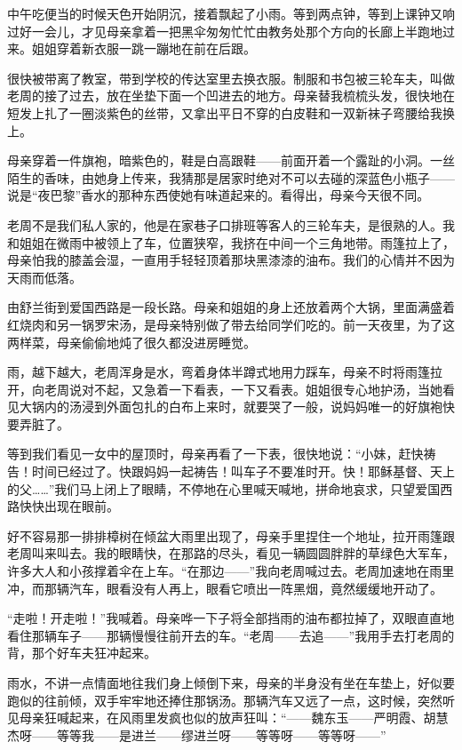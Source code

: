 \par 中午吃便当的时候天色开始阴沉，接着飘起了小雨。等到两点钟，等到上课钟又响过好一会儿，才见母亲拿着一把黑伞匆匆忙忙由教务处那个方向的长廊上半跑地过来。姐姐穿着新衣服一跳一蹦地在前在后跟。
\par 很快被带离了教室，带到学校的传达室里去换衣服。制服和书包被三轮车夫，叫做老周的接了过去，放在坐垫下面一个凹进去的地方。母亲替我梳梳头发，很快地在短发上扎了一圈淡紫色的丝带，又拿出平日不穿的白皮鞋和一双新袜子弯腰给我换上。
\par 母亲穿着一件旗袍，暗紫色的，鞋是白高跟鞋——前面开着一个露趾的小洞。一丝陌生的香味，由她身上传来，我猜那是居家时绝对不可以去碰的深蓝色小瓶子——说是“夜巴黎”香水的那种东西使她有味道起来的。看得出，母亲今天很不同。
\par 老周不是我们私人家的，他是在家巷子口排班等客人的三轮车夫，是很熟的人。我和姐姐在微雨中被领上了车，位置狭窄，我挤在中间一个三角地带。雨篷拉上了，母亲怕我的膝盖会湿，一直用手轻轻顶着那块黑漆漆的油布。我们的心情并不因为天雨而低落。
\par 由舒兰街到爱国西路是一段长路。母亲和姐姐的身上还放着两个大锅，里面满盛着红烧肉和另一锅罗宋汤，是母亲特别做了带去给同学们吃的。前一天夜里，为了这两样菜，母亲偷偷地炖了很久都没进房睡觉。
\par 雨，越下越大，老周浑身是水，弯着身体半蹲式地用力踩车，母亲不时将雨篷拉开，向老周说对不起，又急着一下看表，一下又看表。姐姐很专心地护汤，当她看见大锅内的汤浸到外面包扎的白布上来时，就要哭了一般，说妈妈唯一的好旗袍快要弄脏了。
\par 等到我们看见一女中的屋顶时，母亲再看了一下表，很快地说：“小妹，赶快祷告！时间已经过了。快跟妈妈一起祷告！叫车子不要准时开。快！耶稣基督、天上的父……”我们马上闭上了眼睛，不停地在心里喊天喊地，拼命地哀求，只望爱国西路快快出现在眼前。
\par 好不容易那一排排樟树在倾盆大雨里出现了，母亲手里捏住一个地址，拉开雨篷跟老周叫来叫去。我的眼睛快，在那路的尽头，看见一辆圆圆胖胖的草绿色大军车，许多大人和小孩撑着伞在上车。“在那边——”我向老周喊过去。老周加速地在雨里冲，而那辆汽车，眼看没有人再上，眼看它喷出一阵黑烟，竟然缓缓地开动了。
\par “走啦！开走啦！”我喊着。母亲哗一下子将全部挡雨的油布都拉掉了，双眼直直地看住那辆车子——那辆慢慢往前开去的车。“老周——去追——”我用手去打老周的背，那个好车夫狂冲起来。
\par 雨水，不讲一点情面地往我们身上倾倒下来，母亲的半身没有坐在车垫上，好似要跑似的往前倾，双手牢牢地还捧住那锅汤。那辆汽车又远了一点，这时候，突然听见母亲狂喊起来，在风雨里发疯也似的放声狂叫：“——魏东玉——严明霞、胡慧杰呀——等等我——是进兰——缪进兰呀——等等呀——等等呀——”
